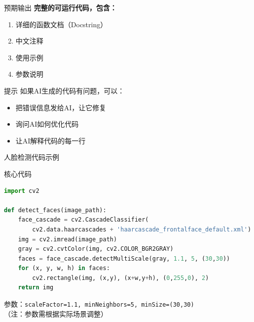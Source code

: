 \begin{frame}{预期输出}
	\textbf{完整的可运行代码，包含：}
	\begin{enumerate}
		\item 详细的函数文档（Docstring）
		\item 中文注释
		\item 使用示例
		\item 参数说明
	\end{enumerate}

	\vspace{0.3cm}

	\begin{alertblock}{提示}
		如果AI生成的代码有问题，可以：
		\begin{itemize}
			\item 把错误信息发给AI，让它修复
			\item 询问AI如何优化代码
			\item 让AI解释代码的每一行
		\end{itemize}
	\end{alertblock}
\end{frame}

\begin{frame}{人脸检测代码示例}
	\begin{block}{核心代码}
		\begin{lstlisting}[language=Python, basicstyle=\ttfamily\tiny]
import cv2

def detect_faces(image_path):
    face_cascade = cv2.CascadeClassifier(
        cv2.data.haarcascades + 'haarcascade_frontalface_default.xml')
    img = cv2.imread(image_path)
    gray = cv2.cvtColor(img, cv2.COLOR_BGR2GRAY)
    faces = face_cascade.detectMultiScale(gray, 1.1, 5, (30,30))
    for (x, y, w, h) in faces:
        cv2.rectangle(img, (x,y), (x+w,y+h), (0,255,0), 2)
    return img
		\end{lstlisting}
	\end{block}

	\vspace{0.2cm}

	参数：\texttt{scaleFactor=1.1, minNeighbors=5, minSize=(30,30)}
	\\
	\tiny（注：参数需根据实际场景调整）
\end{frame}
